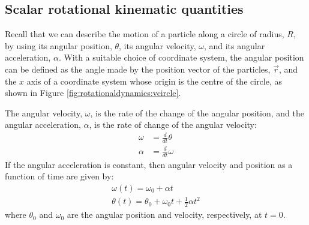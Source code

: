 \subsection{Scalar rotational kinematic quantities}
Recall that we can describe the motion of a particle along a circle of radius, $R$, by using its angular position, $\theta$, its angular velocity, $\omega$, and its angular acceleration, $\alpha$. With a suitable choice of coordinate system, the angular position can be defined as the angle made by the position vector of the particles, $\vec r$, and the $x$ axis of a coordinate system whose origin is the centre of the circle, as shown in Figure \ref{fig:rotationaldynamics:vcircle}. 

The angular velocity, $\omega$, is the rate of the change of the angular position, and the angular acceleration, $\alpha$, is the rate of change of the angular velocity:
\begin{align*}
\omega &= \frac{d}{dt}\theta \\
\alpha &= \frac{d}{dt}\omega
\end{align*}
If the angular acceleration is constant, then angular velocity and position as a function of time are given by:
\begin{align*}
\omega(t) = \omega_0+\alpha t\\
\theta(t) = \theta_0+\omega_0 t+\frac{1}{2}\alpha t^2
\end{align*}
where $\theta_0$ and $\omega_0$ are the angular position and velocity, respectively, at $t=0$.

